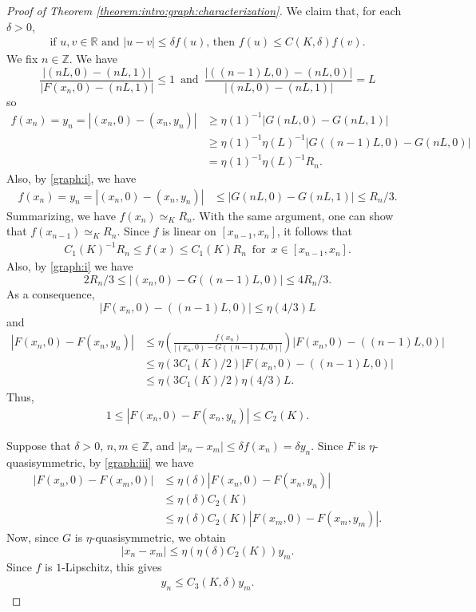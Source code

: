 \documentclass[letterpaper]{amsart}
\theoremstyle{plain}
\theoremstyle{definition}
\theoremstyle{remark}
\numberwithin{equation}{section}
\numberwithin{theorem}{section}
\newcommand{\R}{\mathbb R}
\newcommand{\Z}{\mathbb Z}
\begin{document}
\begin{proof}[Proof of Theorem \ref{theorem:intro:graph:characterization}]
We claim that, for each $\delta>0$, 
\begin{align}\label{graph:claim}
\text{if $u,v\in \R$ and $|u-v|\leq \delta f(u)$, then $f(u)\leq C(K,\delta)f(v)$.}
\end{align}
We fix $n\in \Z$. We have 
$$\frac{|(nL,0)-(nL,1)|}{|F(x_n,0)-(nL,1)|}\leq 1\,\,\, \text{and} \,\,\, \frac{|((n-1)L,0)-(nL,0)|}{|(nL,0)-(nL,1)|}=L$$
so
\begin{align*}
f(x_n)=y_n=|(x_n,0)-(x_n,y_n)| &\geq \eta(1)^{-1} |G(nL,0)-G(nL,1)|\\
&\geq \eta(1)^{-1} \eta(L)^{-1} |G((n-1)L,0)-G(nL,0)|\\
&= \eta(1)^{-1} \eta(L)^{-1}R_n.
\end{align*}
Also, by \eqref{graph:i}, we have
\begin{align*}
f(x_n)=y_n=|(x_n,0)-(x_n,y_n)|&\leq |G(nL,0)-G(nL,1)| \leq  R_n/3.
\end{align*}
Summarizing, we have $f(x_n)\simeq_K R_n$. With the same argument, one can show that $f(x_{n-1})\simeq_K R_n$. Since $f$ is linear on $[x_{n-1},x_n]$, it follows that 
\begin{align}\label{graph:ii}
C_1(K)^{-1}R_n\leq f(x)\leq C_1(K) R_n\,\,\, \text{for} \,\,\, x\in [x_{n-1},x_n].
\end{align}
Also, by \eqref{graph:i} we have
$$2R_n/3\leq |(x_n,0)- G((n-1)L,0)|\leq 4R_n/3.$$
As a consequence, 
$$|F(x_n,0)-((n-1)L,0)|\leq \eta(4/3)L$$
and
\begin{align*}
|F(x_n,0)-F(x_n,y_n)|&\leq \eta\left(\frac{f(x_n)}{|(x_n,0)-G((n-1)L,0)|}\right)|F(x_n,0)-((n-1)L,0)|\\
&\leq \eta(3C_1(K)/2)|F(x_n,0)-((n-1)L,0)|\\
&\leq \eta(3C_1(K)/2) \eta(4/3)L.
\end{align*}
Thus, 
\begin{align}\label{graph:iii}
1\leq |F(x_n,0)-F(x_n,y_n)| \leq C_2(K).
\end{align}

Suppose that $\delta>0$, $n,m\in \Z$, and $|x_n-x_m|\leq \delta f(x_n)=\delta y_n$. Since $F$ is $\eta$-quasisymmetric, by \eqref{graph:iii} we have 
\begin{align*}
|F(x_n,0)-F(x_m,0)|&\leq \eta(\delta) |F(x_n,0)-F(x_n,y_n)|\\
&\leq \eta(\delta)C_2(K)\\
&\leq \eta(\delta)C_2(K) |F(x_m,0)-F(x_m,y_m)|.
\end{align*}
Now, since $G$ is $\eta$-quasisymmetric, we obtain
$$|x_n-x_m| \leq \eta(\eta(\delta) C_2(K)) y_m.$$ 
Since $f$ is $1$-Lipschitz, this gives 
\begin{align}\label{graph:iv}
y_n\leq C_3(K,\delta) y_m. 
\end{align}


\end{proof}
\end{document}
